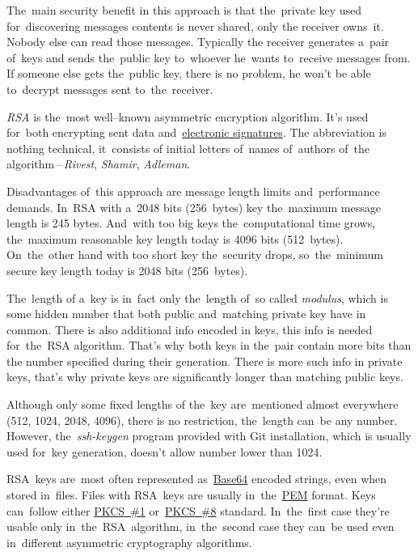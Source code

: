 \noindent The~main security benefit in this approach is that the~private key used for~discovering messages contents is never shared, only the receiver owns~it.
Nobody else can read those messages.
Typically the receiver generates a~pair of~keys and sends the~public key to~whoever he~wants to~receive messages from.
If someone else gets the~public key, there is no problem, he won't be able to~decrypt messages sent to~the~receiver.

\label{rsa}
\textit{RSA} is the~most well--known asymmetric encryption algorithm.
It's used for~both encrypting sent data and~\hyperref[electronicsignature]{electronic signatures}.
The abbreviation is nothing technical, it~consists of initial letters of~names of~authors of~the algorithm\,--\,\textit{Rivest}, \textit{Shamir}, \textit{Adleman}.

Disadvantages of~this approach are message length limits and~performance demands.
In~RSA with a~2048 bits (256~bytes) key the~maximum message length is 245 bytes.
And~with too big keys the~computational time grows, the~maximum reasonable key length today is 4096 bits (512~bytes).
On~the~other hand with too short key the~security drops, so~the~minimum secure key length today is 2048 bits (256~bytes).

The~length of a~key is in~fact only the~length of~so called \textit{modulus}, which is some hidden number that both public and~matching private key have in common.
There is also additional info encoded in keys, this info is needed for~the~RSA algorithm.
That's why both keys in the~pair contain more bits than the number specified during their generation.
There is more such info in private keys, that's why private keys are significantly longer than matching public keys.

\warning Although only some fixed lengths of the~key are~mentioned almost everywhere (512, 1024, 2048, 4096), there is no restriction, the~length can~be any number.
However, the~\textit{ssh-keygen} program provided with Git installation, which is usually used for~key generation, doesn't allow number lower than 1024.

RSA~keys are~most often represented as~\hyperref[base64]{\mbox{Base64}} encoded strings, even when stored in~files.
Files with RSA~keys are usually in~the~\hyperref[pem]{PEM} format.
Keys can~follow either \hyperref[pkcs]{PKCS~\#1} or~\hyperref[pkcs]{PKCS~\#8} standard.
In~the~first case they're usable only in~the~RSA~algorithm, in~the~second case they can~be used even in~different asymmetric cryptography algorithms.

